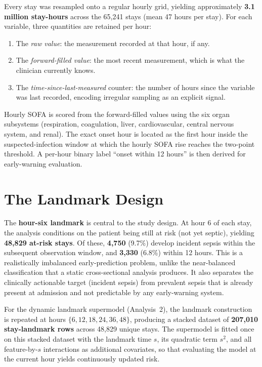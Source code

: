 Every stay was resampled onto a regular hourly grid, yielding approximately
\textbf{3.1 million stay-hours} across the 65{,}241 stays (mean 47 hours per
stay). For each variable, three quantities are retained per hour:
\begin{enumerate}
  \item The \emph{raw value}: the measurement recorded at that hour, if any.
  \item The \emph{forward-filled value}: the most recent measurement, which is
  what the clinician currently knows.
  \item The \emph{time-since-last-measured} counter: the number of hours since
  the variable was last recorded, encoding irregular sampling as an explicit
  signal.
\end{enumerate}

Hourly SOFA is scored from the forward-filled values using the six organ
subsystems (respiration, coagulation, liver, cardiovascular, central nervous
system, and renal). The exact onset hour is located as the first hour inside
the suspected-infection window at which the hourly SOFA rise reaches the
two-point threshold. A per-hour binary label ``onset within 12 hours'' is
then derived for early-warning evaluation.

\section{The Landmark Design}
\label{sec:landmark}

The \textbf{hour-six landmark} is central to the study design. At hour 6 of
each stay, the analysis conditions on the patient being still at risk
(not yet septic), yielding \textbf{48{,}829 at-risk stays}. Of these,
\textbf{4{,}750} (9.7\%) develop incident sepsis within the subsequent
observation window, and \textbf{3{,}330} (6.8\%) within 12 hours. This is a
realistically imbalanced early-prediction problem, unlike the near-balanced
classification that a static cross-sectional analysis produces. It also
separates the clinically actionable target (incident sepsis) from prevalent
sepsis that is already present at admission and not predictable by any
early-warning system.

For the dynamic landmark supermodel (Analysis~2), the landmark construction is
repeated at hours $\{6, 12, 18, 24, 36, 48\}$, producing a stacked dataset of
\textbf{207{,}010 stay-landmark rows} across 48{,}829 unique stays. The
supermodel is fitted once on this stacked dataset with the landmark time $s$,
its quadratic term $s^2$, and all feature-by-$s$ interactions as additional
covariates, so that evaluating the model at the current hour yields
continuously updated risk.

